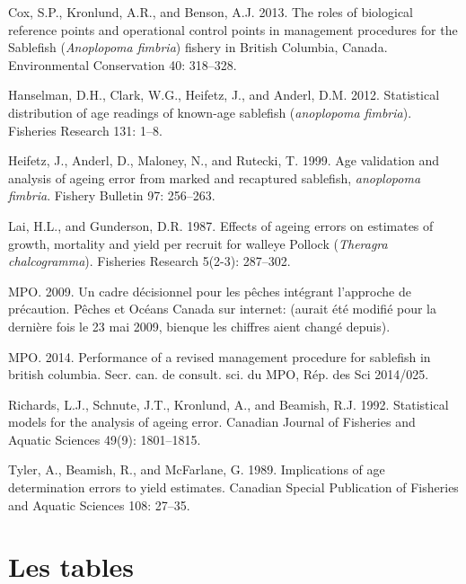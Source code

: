 \documentclass[11pt]{book}
\begin{document}
\leavevmode\hypertarget{ref-cox2013roles}{}%
Cox, S.P., Kronlund, A.R., and Benson, A.J. 2013. The roles of biological reference points and operational control points in management procedures for the Sablefish (\emph{Anoplopoma fimbria}) fishery in British Columbia, Canada. Environmental Conservation 40: 318--328.

\leavevmode\hypertarget{ref-hanselman2012statistical}{}%
Hanselman, D.H., Clark, W.G., Heifetz, J., and Anderl, D.M. 2012. Statistical distribution of age readings of known-age sablefish (\emph{anoplopoma fimbria}). Fisheries Research 131: 1--8.

\leavevmode\hypertarget{ref-heifetz1999age}{}%
Heifetz, J., Anderl, D., Maloney, N., and Rutecki, T. 1999. Age validation and analysis of ageing error from marked and recaptured sablefish, \emph{anoplopoma fimbria}. Fishery Bulletin 97: 256--263.

\leavevmode\hypertarget{ref-lai1987effects}{}%
Lai, H.L., and Gunderson, D.R. 1987. Effects of ageing errors on estimates of growth, mortality and yield per recruit for walleye Pollock (\emph{Theragra chalcogramma}). Fisheries Research 5(2-3): 287--302.

\leavevmode\hypertarget{ref-DFO2009}{}%
MPO. 2009. Un cadre décisionnel pour les pêches intégrant l'approche de précaution. Pêches et Océans Canada sur internet: (aurait été modifié pour la dernière fois le 23 mai 2009, bienque les chiffres aient changé depuis).

\leavevmode\hypertarget{ref-dfo2014performanc}{}%
MPO. 2014. Performance of a revised management procedure for sablefish in british columbia. Secr. can. de consult. sci. du MPO, Rép. des Sci 2014/025.

\leavevmode\hypertarget{ref-richards1992statistical}{}%
Richards, L.J., Schnute, J.T., Kronlund, A., and Beamish, R.J. 1992. Statistical models for the analysis of ageing error. Canadian Journal of Fisheries and Aquatic Sciences 49(9): 1801--1815.

\leavevmode\hypertarget{ref-tyler1989implications}{}%
Tyler, A., Beamish, R., and McFarlane, G. 1989. Implications of age determination errors to yield estimates. Canadian Special Publication of Fisheries and Aquatic Sciences 108: 27--35.

\setlength{\parindent}{0in} 
\setlength{\leftskip}{0in} 
\setlength{\parskip}{4pt}

\newpage
\setcounter{table}{0}

\hypertarget{les-tables}{%
\section{Les tables}\label{les-tables}}
\end{document}

